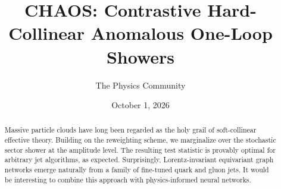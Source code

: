 \documentclass[11pt]{article}
\title{CHAOS: Contrastive Hard-Collinear Anomalous One-Loop Showers}
\author{The Physics Community}
\date{October 1, 2026}
\numberwithin{equation}{section}
\theoremstyle{definition}
\theoremstyle{remark}
\begin{document}
\maketitle
\begin{abstract}
Massive particle clouds have long been regarded as the holy grail of
soft-collinear effective theory. Building on the reweighting scheme, we
marginalize over the stochastic sector shower at the amplitude level.
The resulting test statistic is provably optimal for arbitrary jet
algorithms, as expected. Surprisingly, Lorentz-invariant equivariant
graph networks emerge naturally from a family of fine-tuned quark and
gluon jets. It would be interesting to combine this approach with
physics-informed neural networks.
\end{abstract}
\tableofcontents




\nocite{*}


\end{document}

